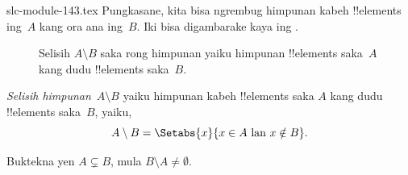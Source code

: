 \begin{filecontents*}[overwrite]{slc-module-143.tex}
Pungkasane, kita bisa ngrembug himpunan kabeh !!{element}s
ing~$A$ kang ora ana ing~$B$. Iki bisa digambarake kaya
ing .

\begin{figure}
  \caption{Selisih $A \setminus B$ saka rong himpunan yaiku
    himpunan !!{element}s saka~$A$ kang dudu
    !!{element}s saka~$B$.}
\end{figure}

\begin{defn}[Selisih]
\emph{Selisih himpunan}~$A \setminus B$ yaiku himpunan kabeh
!!{element}s saka $A$ kang dudu !!{element}s saka~$B$,
yaiku,
\[
A\setminus B = \Setabs{x}{x\in A \text{ lan } x \notin B}.
\]
\end{defn}

\begin{prob}
	Buktekna yen $A \subsetneq B$, mula $B \setminus A \neq \emptyset$.
\end{prob}


\end{filecontents*}

